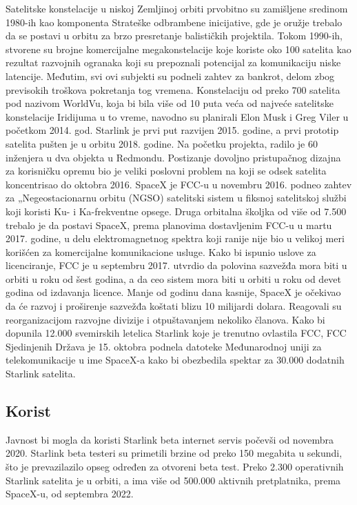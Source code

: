 \documentclass[a4paper,11pt]{article}
\begin{document}
Satelitske konstelacije u niskoj Zemljinoj orbiti prvobitno su zamišljene sredinom 1980-ih kao komponenta Strateške odbrambene inicijative, gde je oružje trebalo da se postavi u orbitu za brzo presretanje balističkih projektila. Tokom 1990-ih, stvorene su brojne komercijalne megakonstelacije koje koriste oko 100 satelita kao rezultat razvojnih ogranaka koji su prepoznali potencijal za komunikaciju niske latencije. Međutim, svi ovi subjekti su podneli zahtev za bankrot, delom zbog previsokih troškova pokretanja tog vremena. Konstelaciju od preko 700 satelita pod nazivom WorldVu, koja bi bila više od 10 puta veća od najveće satelitske konstelacije Iridijuma u to vreme, navodno su planirali Elon Musk i Greg Viler u početkom 2014. god. Starlink je prvi put razvijen 2015. godine, a prvi prototip satelita pušten je u orbitu 2018. godine. Na početku projekta, radilo je 60 inženjera u dva objekta u Redmondu. Postizanje dovoljno pristupačnog dizajna za korisničku opremu bio je veliki poslovni problem na koji se odsek satelita koncentrisao do oktobra 2016.
SpaceX je FCC-u u novembru 2016. podneo zahtev za „Negeostacionarnu orbitu (NGSO) satelitski sistem u fiksnoj satelitskoj službi koji koristi Ku- i Ka-frekventne opsege. Druga orbitalna školjka od više od 7.500 trebalo je da postavi SpaceX, prema planovima dostavljenim FCC-u u martu 2017. godine, u delu elektromagnetnog spektra koji ranije nije bio u velikoj meri korišćen za komercijalne komunikacione usluge. Kako bi ispunio uslove za licenciranje, FCC je u septembru 2017. utvrdio da polovina sazvežđa mora biti u orbiti u roku od šest godina, a da ceo sistem mora biti u orbiti u roku od devet godina od izdavanja licence. Manje od godinu dana kasnije, SpaceX je očekivao da će razvoj i proširenje sazvežđa koštati blizu 10 milijardi dolara. Reagovali su reorganizacijom razvojne divizije i otpuštavanjem nekoliko članova. Kako bi dopunila 12.000 svemirskih letelica Starlink koje je trenutno ovlastila FCC, FCC Sjedinjenih Država je 15. oktobra podnela datoteke Međunarodnoj uniji za telekomunikacije u ime SpaceX-a kako bi obezbedila spektar za 30.000 dodatnih Starlink satelita.

\subsection{Korist}
\label{sec:Korist}


Javnost bi mogla da koristi Starlink beta internet servis počevši od novembra 2020. Starlink beta testeri su primetili brzine od preko 150 megabita u sekundi, što je prevazilazilo opseg određen za otvoreni beta test. Preko 2.300 operativnih Starlink satelita je u orbiti, a ima više od 500.000 aktivnih pretplatnika, prema SpaceX-u, od septembra 2022.
\end{document}
